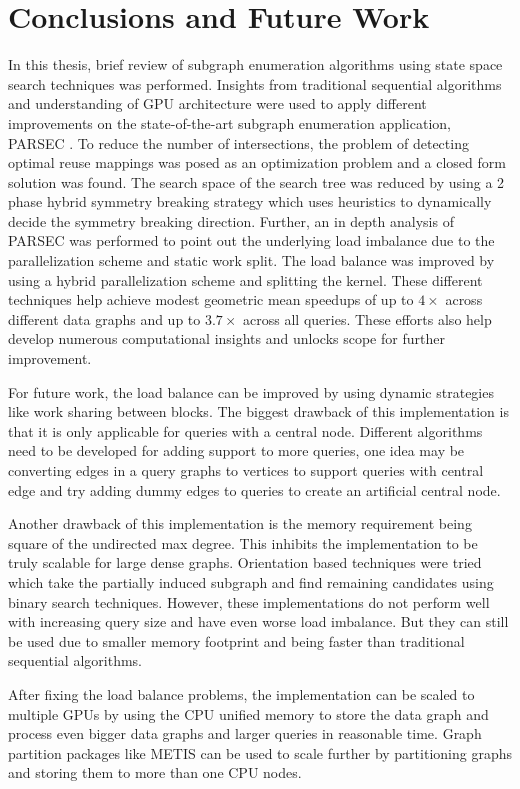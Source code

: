 \chapter{Conclusions and Future Work}\label{chap:conclusions}

In this thesis, brief review of subgraph enumeration algorithms using state space search techniques was performed.
Insights from traditional sequential algorithms and understanding of GPU architecture were used to apply different improvements on the state-of-the-art subgraph enumeration application, PARSEC \cite{PARSEC_VD}.
To reduce the number of intersections, the problem of detecting optimal reuse mappings was posed as an optimization problem and a closed form solution was found.
The search space of the search tree was reduced by using a 2 phase hybrid symmetry breaking strategy which uses heuristics to dynamically decide the symmetry breaking direction.
Further, an in depth analysis of PARSEC \cite{PARSEC_VD} was performed to point out the underlying load imbalance due to the parallelization scheme and static work split.
The load balance was improved by using a hybrid parallelization scheme and splitting the kernel.
These different techniques help achieve modest geometric mean speedups of up to $4\times$ across different data graphs and up to $3.7\times$ across all queries.
These efforts also help develop numerous computational insights and unlocks scope for further improvement.

For future work, the load balance can be improved by using dynamic strategies like work sharing between blocks.
The biggest drawback of this implementation is that it is only applicable for queries with a central node.
Different algorithms need to be developed for adding support to more queries, one idea may be converting edges in a query graphs to vertices to support queries with central edge and try adding dummy edges to queries to create an artificial central node.

Another drawback of this implementation is the memory requirement being square of the undirected max degree. This inhibits the implementation to be truly scalable for large dense graphs.
Orientation based techniques were tried which take the partially induced subgraph and find remaining candidates using binary search techniques. However, these implementations do not perform well with increasing query size and have even worse load imbalance.
But they can still be used due to smaller memory footprint and being faster than traditional sequential algorithms.

After fixing the load balance problems, the implementation can be scaled to multiple GPUs by using the CPU unified memory to store the data graph and process even bigger data graphs and larger queries in reasonable time.
Graph partition packages like METIS \cite{metis} can be used to scale further by partitioning graphs and storing them to more than one CPU nodes.